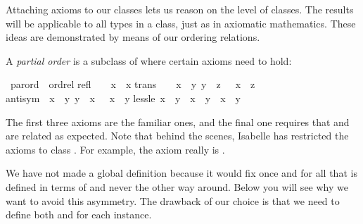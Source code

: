 %
\begin{isabellebody}%
\def\isabellecontext{Axioms}%
\isamarkupfalse%
%
\isamarkuptrue%
%
\begin{isamarkuptext}%
Attaching axioms to our classes lets us reason on the
level of classes.  The results will be applicable to all types in a class,
just as in axiomatic mathematics.  These ideas are demonstrated by means of
our ordering relations.%
\end{isamarkuptext}%
\isamarkuptrue%
%
\isamarkuptrue%
%
\begin{isamarkuptext}%
A \emph{partial order} is a subclass of 
where certain axioms need to hold:%
\end{isamarkuptext}%
\isamarkuptrue%
\ parord\ {\isacharless}\ ordrel\isanewline
refl{\isacharcolon}\ \ \ \ {\isachardoublequote}x\ {\isacharless}{\isacharless}{\isacharequal}\ x{\isachardoublequote}\isanewline
trans{\isacharcolon}\ \ \ {\isachardoublequote}{\isasymlbrakk}\ x\ {\isacharless}{\isacharless}{\isacharequal}\ y{\isacharsemicolon}\ y\ {\isacharless}{\isacharless}{\isacharequal}\ z\ {\isasymrbrakk}\ {\isasymLongrightarrow}\ x\ {\isacharless}{\isacharless}{\isacharequal}\ z{\isachardoublequote}\isanewline
antisym{\isacharcolon}\ {\isachardoublequote}{\isasymlbrakk}\ x\ {\isacharless}{\isacharless}{\isacharequal}\ y{\isacharsemicolon}\ y\ {\isacharless}{\isacharless}{\isacharequal}\ x\ {\isasymrbrakk}\ {\isasymLongrightarrow}\ x\ {\isacharequal}\ y{\isachardoublequote}\isanewline
less{\isacharunderscore}le{\isacharcolon}\ {\isachardoublequote}x\ {\isacharless}{\isacharless}\ y\ {\isacharequal}\ {\isacharparenleft}x\ {\isacharless}{\isacharless}{\isacharequal}\ y\ {\isasymand}\ x\ {\isasymnoteq}\ y{\isacharparenright}{\isachardoublequote}\isamarkupfalse%
%
\begin{isamarkuptext}%
\noindent
The first three axioms are the familiar ones, and the final one
requires that \isa{{\isacharless}{\isacharless}} and \isa{{\isacharless}{\isacharless}{\isacharequal}} are related as expected.
Note that behind the scenes, Isabelle has restricted the axioms to class
. For example, the axiom  really is
.

We have not made  a global definition because it would
fix once and for all that \isa{{\isacharless}{\isacharless}} is defined in terms of \isa{{\isacharless}{\isacharless}{\isacharequal}} and
never the other way around. Below you will see why we want to avoid this
asymmetry. The drawback of our choice is that
we need to define both \isa{{\isacharless}{\isacharless}{\isacharequal}} and \isa{{\isacharless}{\isacharless}} for each instance.


\end{isamarkuptext}
\end{isabellebody}

